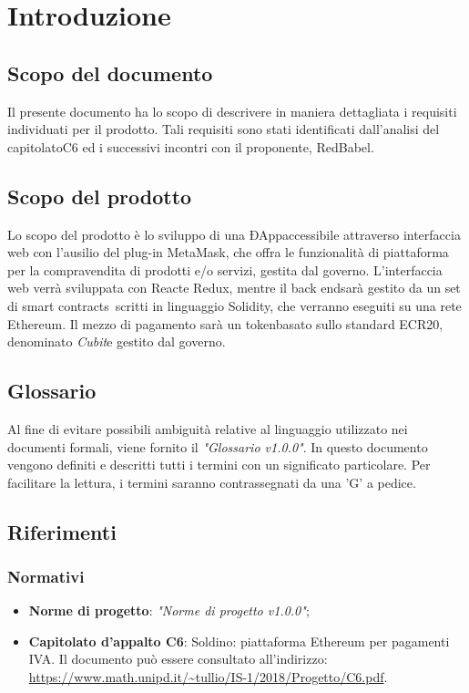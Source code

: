\section{Introduzione} 
\subsection{Scopo del documento}
Il presente documento ha lo scopo di descrivere in maniera dettagliata i requisiti individuati per il prodotto. Tali requisiti sono stati identificati dall'analisi del capitolato\glosp C6 ed i successivi incontri con il proponente, RedBabel.
\subsection{Scopo del prodotto}
Lo scopo del prodotto è lo sviluppo di una ÐApp\glosp accessibile attraverso interfaccia web con l'ausilio del plug-in MetaMask\glo, che offra le funzionalità di piattaforma per la compravendita di prodotti e/o servizi, gestita dal governo\glo. L'interfaccia web verrà sviluppata con React\glosp e Redux\glo, mentre il back end\glosp sarà gestito da un set di smart contracts\ scritti in linguaggio Solidity\glo, che verranno eseguiti su una rete Ethereum\glo.  Il mezzo di pagamento sarà un token\glosp basato sullo standard ECR20\glo, denominato \textit{Cubit}\glosp e gestito dal governo\glo.

\subsection{Glossario}
Al fine di evitare possibili ambiguità relative al linguaggio utilizzato nei documenti formali, viene fornito il \textit{"Glossario v1.0.0"}. In questo documento vengono definiti e descritti tutti i termini con un significato particolare. Per facilitare la lettura, i termini saranno contrassegnati da una 'G' a pedice.
\subsection{Riferimenti}
\subsubsection{Normativi}
\begin{itemize}
	\item \textbf{Norme di progetto}: \textit{"Norme di progetto v1.0.0"};
	\item \textbf{Capitolato d'appalto C6}: Soldino: piattaforma Ethereum per pagamenti IVA. Il documento può essere consultato all'indirizzo: \textsf{\url{ https://www.math.unipd.it/~tullio/IS-1/2018/Progetto/C6.pdf}}.
\end{itemize}
